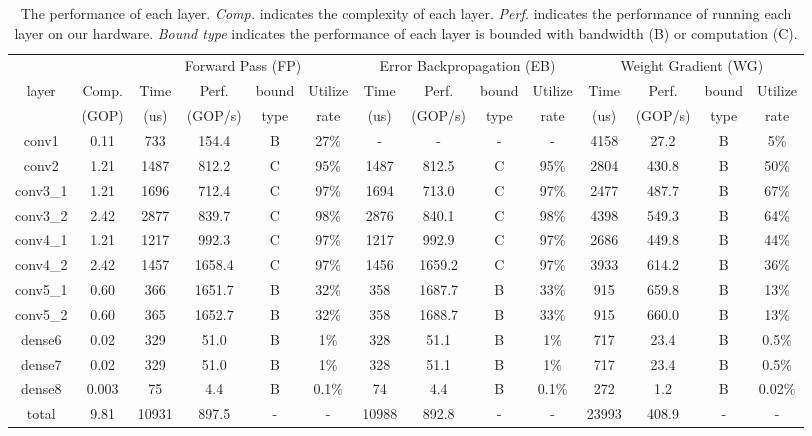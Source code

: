 
\begin{table*}[tb]
    \centering
    \caption{The performance of each layer. \textit{Comp.} indicates the complexity of each layer. \textit{Perf.} indicates the performance of running each layer on our hardware. \textit{Bound type} indicates the performance of each layer is bounded with bandwidth (B) or computation (C).}
    \begin{tabular}{c|c|cccc|cccc|cccc}  \hline
        &       & \multicolumn{4}{c|}{Forward Pass (FP)}  & \multicolumn{4}{c|}{Error Backpropagation (EB)} & \multicolumn{4}{c}{Weight Gradient (WG)} \\
  \cline{2-14}layer & Comp. & Time  & Perf. & bound & Utilize & Time  & Perf. & bound & Utilize & Time  & Perf. & bound & Utilize \\
        & (GOP) & (us)  & (GOP/s) & type  & rate  & (us)  & (GOP/s) & type  & rate  & (us)  & (GOP/s) & type  & rate \\
  \hline
  conv1 & 0.11  & 733   & 154.4  & B     & 27\%  & -     & -     & -     & -     & 4158  & 27.2  & B     & 5\% \\
  conv2 & 1.21  & 1487  & 812.2  & C     & 95\%  & 1487  & 812.5  & C     & 95\%  & 2804  & 430.8  & B     & 50\% \\
  conv3\_1 & 1.21  & 1696  & 712.4  & C     & 97\%  & 1694  & 713.0  & C     & 97\%  & 2477  & 487.7  & B     & 67\% \\
  conv3\_2 & 2.42  & 2877  & 839.7  & C     & 98\%  & 2876  & 840.1  & C     & 98\%  & 4398  & 549.3  & B     & 64\% \\
  conv4\_1 & 1.21  & 1217  & 992.3  & C     & 97\%  & 1217  & 992.9  & C     & 97\%  & 2686  & 449.8  & B     & 44\% \\
  conv4\_2 & 2.42  & 1457  & 1658.4  & C     & 97\%  & 1456  & 1659.2  & C     & 97\%  & 3933  & 614.2  & B     & 36\% \\
  conv5\_1 & 0.60  & 366   & 1651.7  & B     & 32\%  & 358   & 1687.7  & B     & 33\%  & 915   & 659.8  & B     & 13\% \\
  conv5\_2 & 0.60  & 365   & 1652.7  & B     & 32\%  & 358   & 1688.7  & B     & 33\%  & 915   & 660.0  & B     & 13\% \\
  dense6 & 0.02  & 329   & 51.0  & B     & 1\%   & 328   & 51.1  & B     & 1\%   & 717   & 23.4  & B     & 0.5\% \\
  dense7 & 0.02  & 329   & 51.0  & B     & 1\%   & 328   & 51.1  & B     & 1\%   & 717   & 23.4  & B     & 0.5\% \\
  dense8 & 0.003  & 75    & 4.4   & B     & 0.1\% & 74    & 4.4   & B     & 0.1\% & 272   & 1.2   & B     & 0.02\% \\
  \hline
  total & 9.81  & 10931  & 897.5  & -     & -     & 10988  & 892.8  & -     & -     & 23993  & 408.9  & -     & - \\
  \hline
  \end{tabular}%
    \label{tab:layerperformance}%
  \end{table*}%
